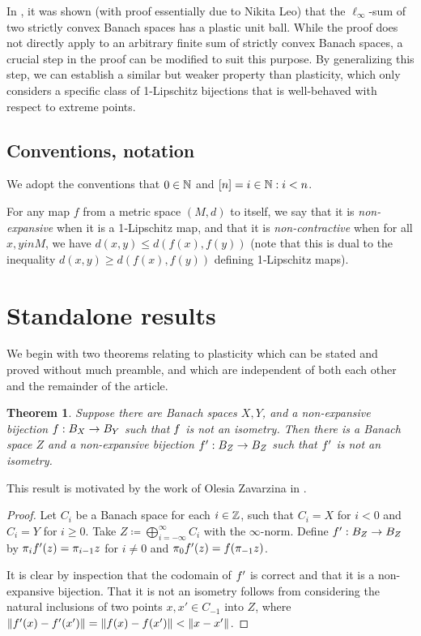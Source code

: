 \documentclass{amsart}
\newtheorem{theorem}{Theorem}
\begin{document}
In \cite{haller:2022}, it was shown (with proof essentially due to Nikita Leo)
that the $\ell_\infty$-sum of two strictly
convex Banach spaces has a plastic unit ball. While the proof does not directly apply to an arbitrary finite sum of strictly convex Banach spaces, a crucial step in the proof can be modified to suit this purpose. By generalizing this step, we can establish a similar but weaker property than plasticity, which only considers a specific class of
1-Lipschitz bijections that is well-behaved with respect to extreme points.

\subsection{Conventions, notation}

We adopt the conventions that $0 \in \mathbb{N}$ and $[n] = {i \in \mathbb{N} : i < n}$.

For any map $f$ from a metric space $(M,d)$ to itself,
we say that it is \textit{non-expansive} when it is a 1‑Lipschitz
map, and that it is \textit{non-contractive} when for all
$x, y in M$, we have $d(x,y) \leq d(f(x), f(y))$ (note
that this is dual to the inequality $d(x,y) \geq d(f(x), f(y))$ defining
1‑Lipschitz maps).

\section{Standalone results}

We begin with two theorems relating to plasticity which can be stated and proved without much preamble, and which are independent of both each other and the remainder of the article.


\begin{theorem}
    Suppose there are Banach spaces $X, Y$, and a non-expansive bijection $f : B_X \to B_Y$ such that $f$ is not an isometry. Then there is a Banach space $Z$ and a non-expansive bijection $f' : B_Z \to B_Z$ such that $f'$ is not an isometry.
\end{theorem}

This result is motivated by the work of Olesia Zavarzina in \cite{zavarzina:2017}.

\begin{proof}
    Let $C_i$ be a Banach space for each $i \in \mathbb{Z}$, such that $C_i = X$
    for $i < 0$ and $C_i = Y$ for $i \geq 0$. Take $Z \coloneqq \bigoplus_{i=-\infty}^\infty C_i$ with the $\infty$-norm. Define $f' : B_Z \to B_Z$ by $\pi_i f'(z) = \pi_{i-1} z$ for $i \neq 0$ and $\pi_0 f'(z) = f(\pi_{-1}z)$.
  
    It is clear by inspection that the codomain of $f'$ is correct and that it is a non-expansive bijection. That it is not an isometry follows from considering the natural inclusions of two points $x, x' \in C_{-1}$ into $Z$, where $\norm{f'(x) - f'(x')} = \norm{f(x)-f(x')} < \norm{x-x'}$.
\end{proof}
\end{document}
